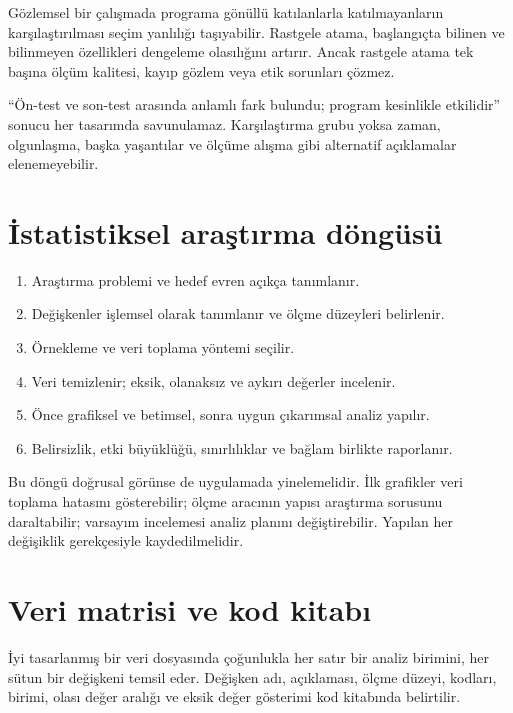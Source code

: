 Gözlemsel bir çalışmada programa gönüllü katılanlarla katılmayanların
karşılaştırılması seçim yanlılığı taşıyabilir. Rastgele atama, başlangıçta
bilinen ve bilinmeyen özellikleri dengeleme olasılığını artırır. Ancak rastgele
atama tek başına ölçüm kalitesi, kayıp gözlem veya etik sorunları çözmez.

\begin{mistakebox}
``Ön-test ve son-test arasında anlamlı fark bulundu; program kesinlikle
etkilidir'' sonucu her tasarımda savunulamaz. Karşılaştırma grubu yoksa zaman,
olgunlaşma, başka yaşantılar ve ölçüme alışma gibi alternatif açıklamalar
elenemeyebilir.
\end{mistakebox}

\section{İstatistiksel araştırma döngüsü}

\begin{enumerate}
  \item Araştırma problemi ve hedef evren açıkça tanımlanır.
  \item Değişkenler işlemsel olarak tanımlanır ve ölçme düzeyleri belirlenir.
  \item Örnekleme ve veri toplama yöntemi seçilir.
  \item Veri temizlenir; eksik, olanaksız ve aykırı değerler incelenir.
  \item Önce grafiksel ve betimsel, sonra uygun çıkarımsal analiz yapılır.
  \item Belirsizlik, etki büyüklüğü, sınırlılıklar ve bağlam birlikte raporlanır.
\end{enumerate}


Bu döngü doğrusal görünse de uygulamada yinelemelidir. İlk grafikler veri
toplama hatasını gösterebilir; ölçme aracının yapısı araştırma sorusunu
daraltabilir; varsayım incelemesi analiz planını değiştirebilir. Yapılan her
değişiklik gerekçesiyle kaydedilmelidir.

\section{Veri matrisi ve kod kitabı}

İyi tasarlanmış bir veri dosyasında çoğunlukla her satır bir analiz birimini,
her sütun bir değişkeni temsil eder. Değişken adı, açıklaması, ölçme düzeyi,
kodları, birimi, olası değer aralığı ve eksik değer gösterimi kod kitabında
belirtilir.


